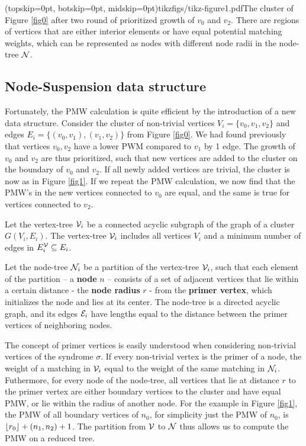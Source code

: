 \Figure[htb](topskip=0pt, botskip=0pt, midskip=0pt){tikzfigs/tikz-figure1.pdf}{The cluster of Figure \ref{fig0} after two round of prioritized growth of $v_0$ and $v_2$. There are regions of vertices that are either interior elements or have equal potential matching weights, which can be represented as nodes with different node radii in the node-tree $\mathcal{N}$. \label{fig1}}

\subsection{Node-Suspension data structure}\label{sec:nodeset}

Fortunately, the PMW calculation is quite efficient by the introduction of a new data structure. Consider the cluster of non-trivial vertices $V_i=\{v_0,v_1,v_2\}$ and edges $E_i = \{(v_0,v_1), (v_1, v_2)\}$ from Figure \ref{fig0}. We had found previously that vertices $v_0, v_2$ have a lower PWM compared to $v_1$ by 1 edge. The growth of $v_0$ and $v_2$ are thus prioritized, such that new vertices are added to the cluster on the boundary of $v_0$ and $v_2$. If all newly added vertices are trivial, the cluster is now as in Figure \ref{fig1}. If we repeat the PMW calculation, we now find that the PMW's in the new vertices connected to $v_0$ are equal, and the same is true for vertices connected to $v_2$. 
\begin{definition}\label{def:vertextree}
    Let the vertex-tree $\mathcal{V}_i$ be a connected acyclic subgraph of the graph of a cluster $G(V_i, E_i)$.   The vertex-tree $\mathcal{V}_i$ includes all vertices $V_i$ and a minimum number of edges in $E^{\mathcal{V}}_i \subseteq E_i$. 
\end{definition}
\begin{definition}
  Let the node-tree $\mathcal{N}_i$ be a partition of the vertex-tree $\mathcal{V}_i$, such that each element of the partition -- a \textbf{node} $n$ -- consists of a set of adjacent vertices that lie within a certain distance - the \textbf{node radius} $r$ - from the \textbf{primer vertex}, which initializes the node and lies at its center. The node-tree is a directed acyclic graph, and its edges $\mathcal{E}_i$ have lengths equal to the distance between the primer vertices of neighboring nodes. 
\end{definition}

The concept of primer vertices is easily understood when considering non-trivial vertices of the syndrome $\sigma$. If every non-trivial vertex is the primer of a node, the weight of a matching in $\mathcal{V}_i$ equal to the weight of the same matching in $\mathcal{N}_i$. Futhermore, for every node of the node-tree, all vertices that lie at distance $r$ to the primer vertex are either boundary vertices to the cluster and have equal PMW, or lie within the radius of another node. For the example in Figure \ref{fig1}, the PMW of all boundary vertices of $n_0$, for simplicity just the PMW of $n_0$, is ${\left \lfloor r_0 \right \rfloor } + (n_1, n_2) + 1$. The partition from $\mathcal{V}$ to $\mathcal{N}$ thus allows us to compute the PMW on a reduced tree. 

